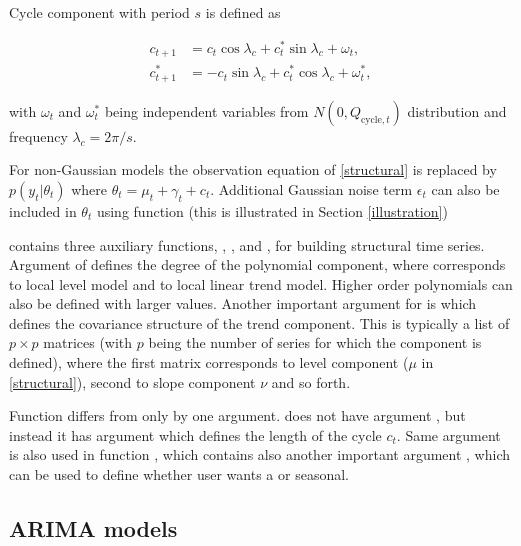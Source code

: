 \documentclass[nojss,article]{jss}\usepackage[]{graphicx}\usepackage[]{color}
\begin{document}
Cycle component with period $s$ is defined as 

\begin{equation*}
\begin{aligned}
c_{t+1} &= c_t\cos\lambda_c + c_t^\ast\sin\lambda_c + \omega_t,\\
c^\ast_{t+1} &= - c_t\sin\lambda_c + c_t^\ast\cos\lambda_c + \omega^\ast_t,
\end{aligned}
\end{equation*}

with $\omega_t$ and $\omega^{\ast}_{t}$ being independent variables from $N(0, Q_{\textrm{cycle},t})$ distribution and frequency $\lambda_c = 2\pi/s$.

For non-Gaussian models the observation equation of \eqref{structural} is replaced by $p(y_t|\theta_t)$ where $\theta_t = \mu_t + \gamma_t + c_t$. Additional Gaussian noise term $\epsilon_t$ can also be included in $\theta_t$ using  function (this is illustrated in Section \ref{illustration})

 contains three auxiliary functions, , , and , for building structural time series. Argument  of  defines the degree of the polynomial component, where  corresponds to local level model and  to local linear trend model. Higher order polynomials can also be defined with larger values. Another important argument for  is  which defines the covariance structure of the trend component. This is typically a list of $p \times p$ matrices (with $p$ being the number of series for which the component is defined), where the first matrix corresponds to level component ($\mu$ in \eqref{structural}), second to slope component $\nu$ and so forth. 

Function  differs from  only by one argument.  does not have argument , but instead it has argument  which defines the length of the cycle $c_t$. Same argument is also used in function , which contains also another important argument , which can be used to define whether user wants a  or  seasonal. 




\subsection{ARIMA models}
\end{document}
